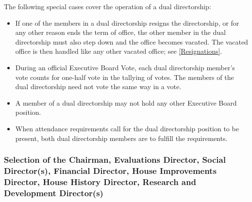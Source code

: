 \documentclass{article}
\newcommand{\asubsection}[1]{\subsubsection{#1} \label{#1}}
\begin{document}
The following special cases cover the operation of a dual directorship:
\begin{itemize}
	\item If one of the members in a dual directorship resigns the directorship, or for any other reason ends the term of office, the other member in the dual directorship must also step down and the office becomes vacated.
		The vacated office is then handled like any other vacated office; see \ref{Resignations}.
	\item During an official Executive Board Vote, each dual directorship member's vote counts for one-half vote in the tallying of votes.
		The members of the dual directorship need not vote the same way in a vote.
	\item A member of a dual directorship may not hold any other Executive Board position.
	\item When attendance requirements call for the dual directorship position to be present, both dual directorship members are to fulfill the requirements.
\end{itemize}
\asubsection{Selection of the Chairman, Evaluations Director, Social Director(s), Financial Director, House Improvements Director, House History Director, Research and Development Director(s)}
\end{document}
